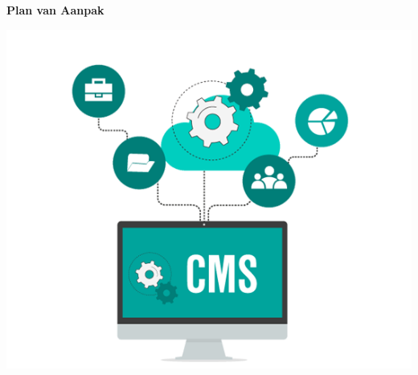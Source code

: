 \begin{titlepage}
   \begin{center}
       \vspace*{1cm}

		\Huge
		\textbf{Plan van Aanpak}

		\vspace{0.5cm}
		
		\LARGE
		\ProjectName
            
		\vspace{1.5cm}

		\textbf{\StudentName}

		\vspace{3.0cm}
		
		\includegraphics[width=1\textwidth]{img/cmsheader.png}
   \end{center}
\end{titlepage}
